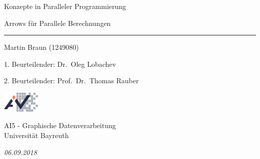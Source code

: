 \documentclass[paper=A4,twoside=true,openright,parskip=full,chapterprefix=true,headings=normal,bibliography=totoc,listof=totoc,titlepage=on,captions=tableabove,draft=false,british]{scrreprt}%
\newcommand{\thesisTitleGerman}{Konzepte in Paralleler Programmierung}
\newcommand{\thesisName}{Martin Braun (1249080)}
\newcommand{\thesisDate}{06.09.2018}
\newcommand{\thesisUniversityDepartmentGerman}{AI5 - Graphische Datenverarbeitung}
\begin{document}
\pagestyle{plain}
\begin{abstract}
Arrows are a general functional interface for computation and an
alternative to Monads for API design. In contrast to Monad-based
parallelism, we explore the use of Arrows for specifying generalised
parallelism. Specifically, we define an Arrow-based language and
implement it using multiple parallel Haskells. As each parallel
computation is an Arrow, such parallel Arrows (PArrows) can be readily
composed and transformed. To allow for more sophisticated communication
schemes between computation nodes in distributed systems, we utilise the
concept of Futures to wrap direct communication. Addressing the recent
trends in cloud computing, we also explore the possibility for a cloud
based implementation of this newly created DSL. To show that PArrows
have similar expressive power as existing parallel languages, we
implement several algorithmic skeletons and four benchmarks. These
show that our framework does not induce any notable
performance overhead. We conclude that Arrows have considerable
potential for composing parallel programs and more specifically for
programs that have to be executed with multiple different parallel
language implementations.
\end{abstract}
\cleardoublepage

\begin{titlepage}
\flushright
\hfill
\vfill
{\huge\thesisTitleGerman \par}
{\LARGE Arrows für Parallele Berechnungen \par}
\rule[5pt]{\textwidth}{.4pt} \par
{\Large\thesisName} \par
{1. Beurteilender: \Large Dr.~Oleg Lobachev} \par
{2. Beurteilender: \Large Prof.~Dr.~Thomas Rauber} \par

\vfill
\vspace*{7cm}
%
\begin{minipage}{2cm}
\includegraphics[height=1cm]{src/img/ai5logo.pdf}
\end{minipage}
%
\begin{minipage}{7cm}
\vspace{16pt}
\thesisUniversityDepartmentGerman \\
Universität Bayreuth \\
\end{minipage}
\hfill
\begin{minipage}{3cm}
\vspace*{18pt}
\begin{flushright}
\textit{\large\thesisDate}
\end{flushright}
\end{minipage}
%
\end{titlepage}
\cleardoublepage
\end{document}
